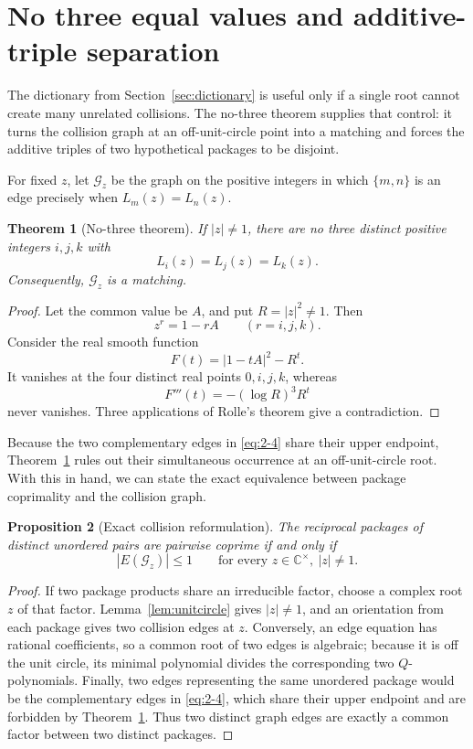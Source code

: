 \documentclass[11pt]{article}
\numberwithin{equation}{section}
\newtheorem{theorem}{Theorem}[section]
\newtheorem{proposition}[theorem]{Proposition}
\theoremstyle{definition}
\newcommand{\C}{\mathbb C}
\begin{document}
\section{No three equal values and additive-triple separation}

The dictionary from Section~\ref{sec:dictionary} is useful only if a single root cannot create many unrelated collisions.  The no-three theorem supplies that control: it turns the collision graph at an off-unit-circle point into a matching and forces the additive triples of two hypothetical packages to be disjoint.

For fixed \(z\), let \(\mathcal G_z\) be the graph on the positive integers in
which \(\{m,n\}\) is an edge precisely when \(L_m(z)=L_n(z)\).

\begin{theorem}[No-three theorem]\label{thm:nothree}
If \(|z|\neq1\), there are no three distinct positive integers \(i,j,k\) with
\[
 L_i(z)=L_j(z)=L_k(z).
\]
Consequently, \(\mathcal G_z\) is a matching.
\end{theorem}

\begin{proof}
Let the common value be \(A\), and put \(R=|z|^2\neq1\).  Then
\[
 z^r=1-rA\qquad(r=i,j,k).
\]
Consider the real smooth function
\[
 F(t)=|1-tA|^2-R^t.
\]
It vanishes at the four distinct real points \(0,i,j,k\), whereas
\[
 F'''(t)=-(\log R)^3R^t
\]
never vanishes.  Three applications of Rolle's theorem give a contradiction.
\end{proof}

Because the two complementary edges in \eqref{eq:2-4} share their upper endpoint,
Theorem~\ref{thm:nothree} rules out their simultaneous occurrence at an
off-unit-circle root.  With this in hand, we can state the exact equivalence
between package coprimality and the collision graph.

\begin{proposition}[Exact collision reformulation]\label{prop:equivalence}
The reciprocal packages of distinct unordered pairs are pairwise coprime if
and only if
\[
 |E(\mathcal G_z)|\leq1
 \qquad\text{for every }z\in\C^\times,\ \lvert z\rvert\neq1.
 \label{eq:3-1}
\]
\end{proposition}

\begin{proof}
If two package products share an irreducible factor, choose a complex root
\(z\) of that factor.  Lemma~\ref{lem:unitcircle} gives \(|z|\neq1\), and
an orientation from each package gives two collision edges at \(z\).
Conversely, an edge equation has rational coefficients, so a common root of
two edges is algebraic; because it is off the unit circle, its minimal
polynomial divides the corresponding two \(Q\)-polynomials.  Finally, two
edges representing the same unordered package would be the complementary
edges in \eqref{eq:2-4}, which share their upper endpoint and are forbidden by
Theorem~\ref{thm:nothree}.  Thus two distinct graph edges are exactly a common
factor between two distinct packages.
\end{proof}
\end{document}
